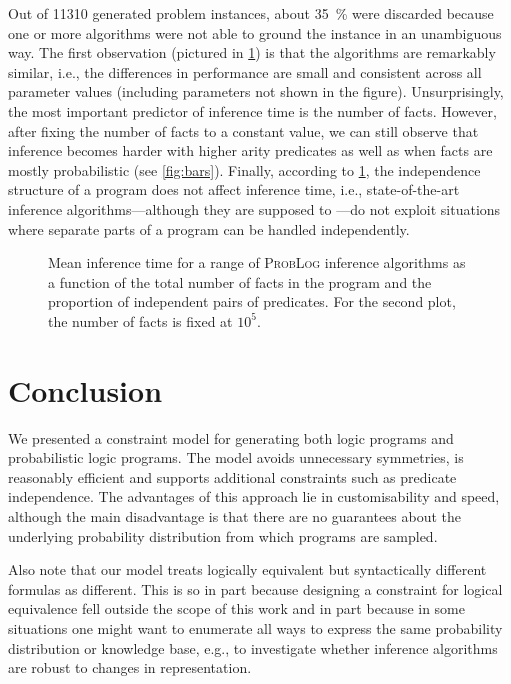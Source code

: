 \documentclass[runningheads]{llncs}
\begin{document}
Out of \num{11310} generated problem instances, about \SI{35}{\percent} were
discarded because one or more algorithms were not able to ground the instance in
an unambiguous way. The first observation (pictured in \cref{fig:line_plots}) is
that the algorithms are remarkably similar, i.e., the differences in performance
are small and consistent across all parameter values (including parameters not
shown in the figure). Unsurprisingly, the most important predictor of inference
time is the number of facts. However, after fixing the number of facts to a
constant value, we can still observe that inference becomes harder with higher
arity predicates as well as when facts are mostly probabilistic (see
\cref{fig:bars}). Finally, according to \cref{fig:line_plots}, the independence
structure of a program does not affect inference time, i.e., state-of-the-art
inference algorithms---although they are supposed to
\cite{DBLP:conf/uai/FierensBTGR11}---do not exploit situations where separate
parts of a program can be handled independently.

\begin{figure}[t]
  \centering
  \caption{Mean inference time for a range of \textsc{ProbLog} inference
    algorithms as a function of the total number of facts in the program and the
    proportion of independent pairs of predicates. For the second plot, the
    number of facts is fixed at $10^5$.}
  \label{fig:line_plots}
\end{figure}

\section{Conclusion}

We presented a constraint model for generating both logic programs and
probabilistic logic programs. The model avoids unnecessary symmetries, is
reasonably efficient and supports additional constraints such as predicate
independence. The advantages of this approach lie in customisability and speed,
although the main disadvantage is that there are no guarantees about the
underlying probability distribution from which programs are sampled.

Also note that our model treats logically equivalent but syntactically
different formulas as different. This is so in part because designing a
constraint for logical equivalence fell outside the scope of this work and in
part because in some situations one might want to enumerate all ways to express
the same probability distribution or knowledge base, e.g., to investigate
whether inference algorithms are robust to changes in representation.
\end{document}
